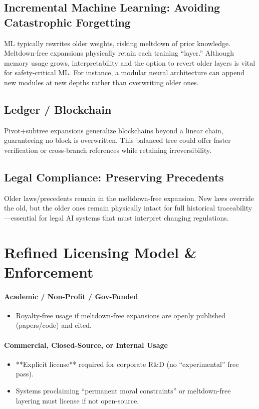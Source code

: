 \documentclass[acmsmall]{acmart}
\theoremstyle{definition}
\theoremstyle{remark}
\begin{document}
\subsection{Incremental Machine Learning: Avoiding Catastrophic Forgetting}
ML typically rewrites older weights, risking meltdown of prior knowledge. 
Meltdown-free expansions physically retain each training “layer.” Although memory
usage grows, interpretability and the option to revert older layers is vital
for safety-critical ML. For instance, a modular neural architecture can append
new modules at new depths rather than overwriting older ones.

\subsection{Ledger / Blockchain}
Pivot+subtree expansions generalize blockchains beyond a linear chain, guaranteeing
no block is overwritten. This balanced tree could offer faster verification or
cross-branch references while retaining irreversibility.

\subsection{Legal Compliance: Preserving Precedents}
Older laws/precedents remain in the meltdown-free expansion. New laws override
the old, but the older ones remain physically intact for full historical
traceability—essential for legal AI systems that must interpret changing
regulations.

\section{Refined Licensing Model \& Enforcement}
\label{sec:licensing}

\paragraph{Academic / Non-Profit / Gov-Funded}
\begin{itemize}[leftmargin=*]
  \item Royalty-free usage if meltdown-free expansions are openly published
        (papers/code) and cited.
\end{itemize}

\paragraph{Commercial, Closed-Source, or Internal Usage}
\begin{itemize}[leftmargin=*]
  \item **Explicit license** required for corporate R\&D (no “experimental”
        free pass).
  \item Systems proclaiming “permanent moral constraints” or meltdown-free layering 
        must license if not open-source.
\end{itemize}
\end{document}

